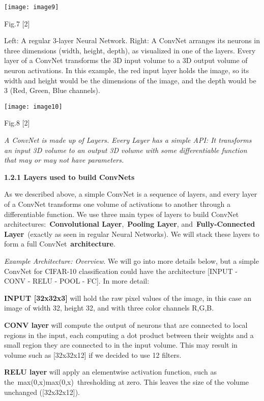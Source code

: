 \documentclass{article} %
\begin{document}
\noindent \texttt{[image: image9]}

\noindent Fig.7  [2]

\noindent Left: A regular 3-layer Neural Network. Right: A ConvNet arranges its neurons in three dimensions (width, height, depth), as visualized in one of the layers. Every layer of a ConvNet transforms the 3D input volume to a 3D output volume of neuron activations. In this example, the red input layer holds the image, so its width and height would be the dimensions of the image, and the depth would be 3 (Red, Green, Blue channels).

\noindent \texttt{[image: image10]}

\noindent Fig.8  [2]

\noindent \textit{A ConvNet is made up of Layers. Every Layer has a simple API: It transforms an input 3D volume to an output 3D volume with some differentiable function that may or may not have parameters.}

\noindent 

\noindent \textbf{1.2.1 Layers used to build ConvNets}

\noindent As we described above, a simple ConvNet is a sequence of layers, and every layer of a ConvNet transforms one volume of activations to another through a differentiable function. We use three main types of layers to build ConvNet architectures:~\textbf{Convolutional Layer},~\textbf{Pooling Layer}, and~\textbf{Fully-Connected Layer}~(exactly as seen in regular Neural Networks). We will stack these layers to form a full ConvNet~\textbf{architecture}.

\noindent \textit{Example Architecture: Overview}. We will go into more details below, but a simple ConvNet for CIFAR-10 classification could have the architecture [INPUT - CONV - RELU - POOL - FC]. In more detail:

\noindent \textbf{INPUT [32x32x3]} will hold the raw pixel values of the image, in this case an image of width 32, height 32, and with three color channels R,G,B.

\noindent \textbf{CONV layer} will compute the output of neurons that are connected to local regions in the input, each computing a dot product between their weights and a small region they are connected to in the input volume. This may result in volume such as [32x32x12] if we decided to use 12 filters.

\noindent \textbf{RELU layer} will apply an elementwise activation function, such as the~max(0,x)max(0,x)~thresholding at zero. This leaves the size of the volume unchanged ([32x32x12]).
\end{document}

